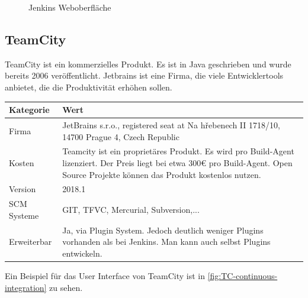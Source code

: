 \begin{figure}[H]
  \centering
  \caption{Jenkins Weboberfläche \cite{Jenkins-Example}}\label{fig:Jenkins-sample}
\end{figure}
\subsection{TeamCity}
TeamCity ist ein kommerzielles Produkt. Es ist in Java geschrieben und wurde bereits 2006 veröffentlicht. Jetbrains ist eine Firma, die viele Entwicklertools anbietet, die die Produktivität erhöhen sollen. 
\begin{center}
  \begin{tabularx}{\textwidth}{lX}
    \toprule
    Kategorie & Wert \\
    \midrule
    Firma &  JetBrains s.r.o., registered seat at Na hřebenech II 1718/10, 14700 Prague 4, Czech Republic \\
		\addlinespace
    Kosten & Teamcity ist ein proprietäres Produkt. Es wird pro Build-Agent lizenziert. Der Preis liegt bei etwa 300€ pro Build-Agent. Open Source Projekte können das Produkt kostenlos nutzen.\\
		\addlinespace
		Version & 2018.1 \\
		\addlinespace
		SCM Systeme & GIT, TFVC, Mercurial, Subversion,...\\
		\addlinespace
		Erweiterbar & Ja, via Plugin System. Jedoch deutlich weniger Plugins vorhanden als bei Jenkins. Man kann auch selbst Plugins entwickeln.\\
    \bottomrule
  \end{tabularx}
\end{center}
Ein Beispiel für das User Interface von TeamCity ist in \autoref{fig:TC-continuous-integration} zu sehen. 


